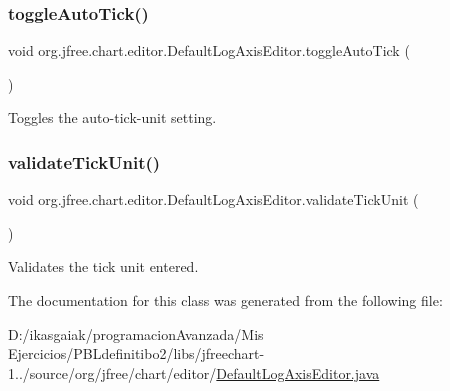 \subsubsection{\texorpdfstring{toggle\+Auto\+Tick()}{toggleAutoTick()}}
{\footnotesize\ttfamily void org.\+jfree.\+chart.\+editor.\+Default\+Log\+Axis\+Editor.\+toggle\+Auto\+Tick (\begin{DoxyParamCaption}{ }\end{DoxyParamCaption})}

Toggles the auto-\/tick-\/unit setting. \mbox{\label{classorg_1_1jfree_1_1chart_1_1editor_1_1_default_log_axis_editor_a95ad3390fd047534e2c25452cdae0be5}} 
\subsubsection{\texorpdfstring{validate\+Tick\+Unit()}{validateTickUnit()}}
{\footnotesize\ttfamily void org.\+jfree.\+chart.\+editor.\+Default\+Log\+Axis\+Editor.\+validate\+Tick\+Unit (\begin{DoxyParamCaption}{ }\end{DoxyParamCaption})}

Validates the tick unit entered. 

The documentation for this class was generated from the following file\+:\begin{DoxyCompactItemize}
\item 
D\+:/ikasgaiak/programacion\+Avanzada/\+Mis Ejercicios/\+P\+B\+Ldefinitibo2/libs/jfreechart-\/1../source/org/jfree/chart/editor/\mbox{\hyperlink{_default_log_axis_editor_8java}{Default\+Log\+Axis\+Editor.\+java}}\end{DoxyCompactItemize}
